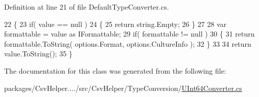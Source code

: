 Definition at line 21 of file Default\-Type\-Converter.\-cs.


\begin{DoxyCode}
22         \{
23             \textcolor{keywordflow}{if}( value == null )
24             \{
25                 \textcolor{keywordflow}{return} string.Empty;
26             \}
27 
28             var formattable = value as IFormattable;
29             \textcolor{keywordflow}{if}( formattable != null )
30             \{
31                 \textcolor{keywordflow}{return} formattable.ToString( options.Format, options.CultureInfo );
32             \}
33 
34             \textcolor{keywordflow}{return} value.ToString();
35         \}
\end{DoxyCode}


The documentation for this class was generated from the following file\-:\begin{DoxyCompactItemize}
\item 
packages/\-Csv\-Helper..../src/\-Csv\-Helper/\-Type\-Conversion/\hyperlink{a00265}{U\-Int64\-Converter.\-cs}\end{DoxyCompactItemize}
